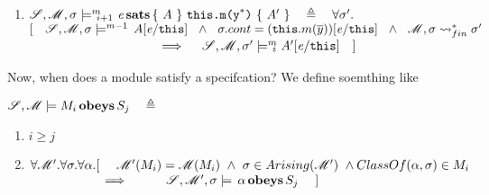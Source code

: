 \begin{definition}
\begin{enumerate}
\item
$ {\mathcal{S}}, {\mathcal M}, \sigma \models^{m} \!\!\!\!_{i+1} \ {\mathit{e}\, \textbf{sats} \, \{ \ A  \ \} \   \mbox{\normalfont{\texttt{this.m(y}}}^*\mbox{\normalfont{\texttt{)}}} \  \{ \  A'  \ \} }
 \ \ \ \triangleq \ \ \
 \forall \sigma'. $\\
$ [ \  \  \ \satM   {\sigma} {m-1}  {A[\re/\prg{this}]}\ \ \wedge\ \  \sigma.cont=(\prg{this}.m(\overline y))[\re/\prg{this}] \ \ \wedge\ \
\Mod, \sigma\leadsto^*_{fin} \sigma'  $\\
$\strut \hspace{3cm} \hfill \ \   \ \  \  \Longrightarrow\ \ \ \  \satMN  {\sigma'} m {i}  {A'[\re/\prg{this}] }\ \ \ ]$

\end{enumerate}

 \end{definition} 
 
 Now, when does a module satisfy a specifcation? We define soemthing like
 
 \begin{definition}
 
 $\Spec, \Mod \models \obeys {M_i} {S_j}\ \ \  \triangleq$ 
 
 \begin{enumerate}
 \item
 $i\geq j $ %
 \item 
 $\forall {\mathcal M}'.\forall \sigma.\forall \alpha.[\ \ \ \  {\mathcal M}' (M_i)={\mathcal M} (M_i)\ \wedge\  \sigma \in Arising({\mathcal M}') \ \wedge ClassOf(\alpha,\sigma)\in M_i$\\
 $  \strut \hspace{2cm}\Longrightarrow \ \ \  \ \ 
\ \ \ \  \satLong \Spec {\Mod'} \sigma {\obeys \alpha {S_j}}\ \ \ \ ]$

\end{enumerate}

 \end{definition} 
 
